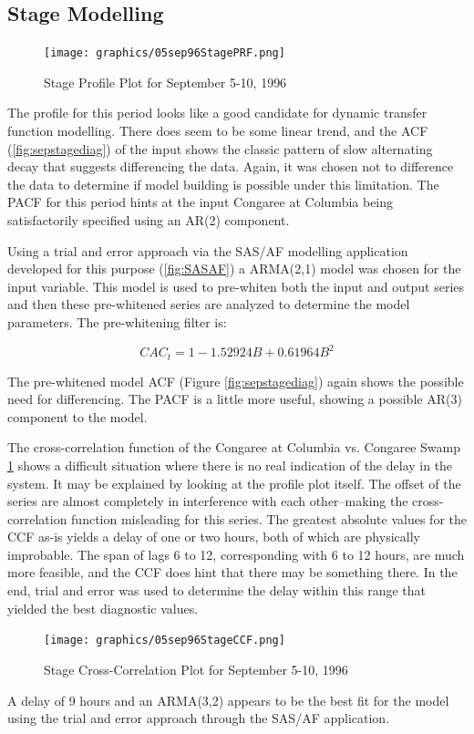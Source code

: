 \documentclass[12pt]{report}
\begin{document}
\subsection{Stage Modelling}%
\begin{figure}[h]
\centering\texttt{[image: graphics/05sep96StagePRF.png]}
\centering\caption{Stage Profile Plot for September 5-10, 1996}
\end{figure}
The profile for this period looks like a good candidate for
dynamic transfer function modelling.  There does seem to be some
linear trend, and the ACF (\ref{fig:sepstagediag}) of the input
shows the classic pattern of slow alternating decay that suggests
differencing the data. Again, it was chosen not to difference the
data to determine if model building is possible under this
limitation.  The PACF for this period hints at the input Congaree
at Columbia being satisfactorily specified using an AR(2)
component.

Using a trial and error approach via the SAS/AF modelling
application developed for this purpose (\ref{fig:SASAF}) a
ARMA(2,1) model was chosen for the input variable.  This model is
used to pre-whiten both the input and output series and then these
pre-whitened series are analyzed to determine the model
parameters.  The pre-whitening filter is:

\begin{equation}\label{eq:congStagPrewhitenFilter}
CAC_t=1-1.52924B+0.61964 B^2
\end{equation}

The pre-whitened model ACF (Figure \ref{fig:sepstagediag}) again
shows the possible need for differencing. The PACF is a little
more useful, showing a possible AR(3) component to the model.

The cross-correlation function of the Congaree at Columbia vs.
Congaree Swamp \ref{fig:sepstageccf} shows a difficult situation
where there is no real indication of the delay in the system. It
may be explained by looking at the profile plot itself.  The
offset of the series are almost completely in interference with
each other--making the cross-correlation function misleading for
this series. The greatest absolute values for the CCF as-is yields
a delay of one or two hours, both of which are physically
improbable.  The span of lags 6 to 12, corresponding with 6 to 12
hours, are much more feasible, and the CCF does hint that there
may be something there. In the end, trial and error was used to
determine the delay within this range that yielded the best
diagnostic values.
\begin{figure}[h]
\centering\texttt{[image: graphics/05sep96StageCCF.png]}
\centering\caption{Stage Cross-Correlation Plot for September
5-10, 1996}\label{fig:sepstageccf}
\end{figure}
A delay of 9 hours and an ARMA(3,2) appears to be the best fit for
the model using the trial and error approach through the SAS/AF
application.
\end{document}
